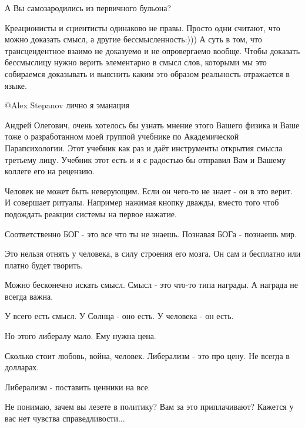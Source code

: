 \begin{multicols}{2}
\begin{itemize} %

А Вы самозародились из первичного бульона?


Креационисты и сциентисты одинаково не правы. Просто одни считают, что можно
доказать смысл, а другие бессмысленность:))) А суть в том, что трансцендентное
взаимо не доказуемо и не опровергаемо  вообще. Чтобы доказать бессмыслицу нужно
верить элементарно в смысл слов, которыми мы это собираемся доказывать и
выяснить каким это образом реальность отражается в языке.

 @Alex Stepanov  лично я эманация
\end{itemize} %


Андрей Олегович, очень хотелось бы узнать мнение этого Вашего физика и Ваше
тоже о разработанном моей группой учебнике по Академической Парапсихологии.
Этот учебник как раз и даёт инструменты открытия смысла третьему лицу. Учебник
этот есть и я с радостью бы отправил Вам и Вашему коллеге его на рецензию.


Человек не может быть неверующим. Если он чего-то не знает - он в это верит. И
совершает ритуалы. Например нажимая кнопку дважды, вместо того чтоб подождать
реакции системы на первое нажатие.

Соответственно БОГ -  это все что ты не знаешь. Познавая БОГа - познаешь мир.

Это нельзя отнять у человека, в силу строения его мозга.  Он сам и бесплатно
или платно будет творить.

Можно бесконечно искать смысл. Смысл - это что-то типа награды. А награда не
всегда важна.

У всего есть смысл. У Солнца - оно есть. У человека - он есть.

Но этого либералу мало. Ему нужна цена.

Сколько стоит любовь, война, человек. Либерализм - это про цену. Не всегда в
долларах. 

Либерализм - поставить ценники на все.


Не понимаю, зачем вы лезете в политику? Вам за это приплачивают? Кажется у вас
нет чувства справедливости...



\end{multicols}
